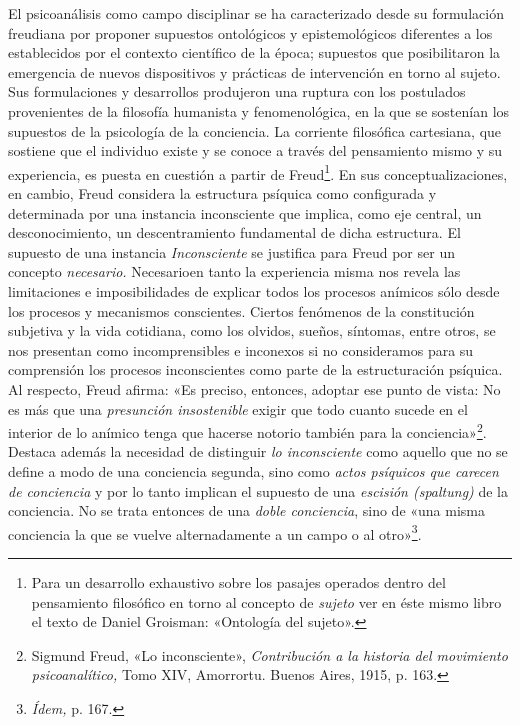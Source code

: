 El psicoanálisis como campo disciplinar se ha caracterizado desde su formulación freudiana por proponer supuestos ontológicos y epistemológicos diferentes a los establecidos por el contexto científico de la época; supuestos que posibilitaron la emergencia de nuevos dispositivos y prácticas de intervención en torno al sujeto. Sus formulaciones y desarrollos produjeron una ruptura con los postulados provenientes de la filosofía humanista y fenomenológica, en la que se sostenían los supuestos de la psicología de la conciencia. La corriente filosófica cartesiana, que sostiene que el individuo existe y se conoce a través del pensamiento mismo y su experiencia, es puesta en cuestión a partir de Freud\footnote{Para un desarrollo exhaustivo sobre los pasajes operados dentro del pensamiento filosófico en torno al concepto de \emph{sujeto} ver en éste mismo libro el texto de Daniel Groisman: «Ontología del sujeto».}. En sus conceptualizaciones, en cambio, Freud considera la estructura psíquica como configurada y determinada por una instancia inconsciente que implica, como eje central, un desconocimiento, un descentramiento fundamental de dicha estructura. El supuesto de una instancia \emph{Inconsciente} se justifica para Freud por ser un concepto \emph{necesario.} Necesarioen tanto la experiencia misma nos revela las limitaciones e imposibilidades de explicar todos los procesos anímicos sólo desde los procesos y mecanismos conscientes. Ciertos fenómenos de la constitución subjetiva y la vida cotidiana, como los olvidos, sueños, síntomas, entre otros, se nos presentan como incomprensibles e inconexos si no consideramos para su comprensión los procesos inconscientes como parte de la estructuración psíquica. Al respecto, Freud afirma: «Es preciso, entonces, adoptar ese punto de vista: No es más que una \emph{presunción insostenible} exigir que todo cuanto sucede en el interior de lo anímico tenga que hacerse notorio también para la conciencia»\footnote{Sigmund Freud, «Lo inconsciente», \emph{Contribución a la historia del movimiento psicoanalítico,} Tomo XIV, Amorrortu. Buenos Aires, 1915, p. 163.}. Destaca además la necesidad de distinguir \emph{lo inconsciente} como aquello que no se define a modo de una conciencia segunda, sino como \emph{actos psíquicos que carecen de conciencia} y por lo tanto implican el supuesto de una \emph{escisión (spaltung)} de la conciencia. No se trata entonces de una \emph{doble conciencia}, sino de «una misma conciencia la que se vuelve alternadamente a un campo o al otro»\footnote{\emph{Ídem,} p. 167.}.

